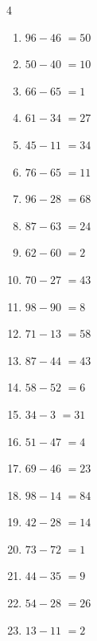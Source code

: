 \begin{multicols}{4}
\begin{enumerate}
  \item $96-46$
        $=50$

  \item $50-40$
        $=10$

  \item $66-65$
        $=1$

  \item $61-34$
        $=27$

  \item $45-11$
        $=34$

  \item $76-65$
        $=11$

  \item $96-28$
        $=68$

  \item $87-63$
        $=24$

  \item $62-60$
        $=2$

  \item $70-27$
        $=43$

  \item $98-90$
        $=8$

  \item $71-13$
        $=58$

  \item $87-44$
        $=43$

  \item $58-52$
        $=6$

  \item $34-3$
        $=31$

  \item $51-47$
        $=4$

  \item $69-46$
        $=23$

  \item $98-14$
        $=84$

\columnbreak %

\resetques

  \item $42-28$
        $=14$

  \item $73-72$
        $=1$

  \item $44-35$
        $=9$

  \item $54-28$
        $=26$

  \item $13-11$
        $=2$


\end{enumerate}
\end{multicols}
